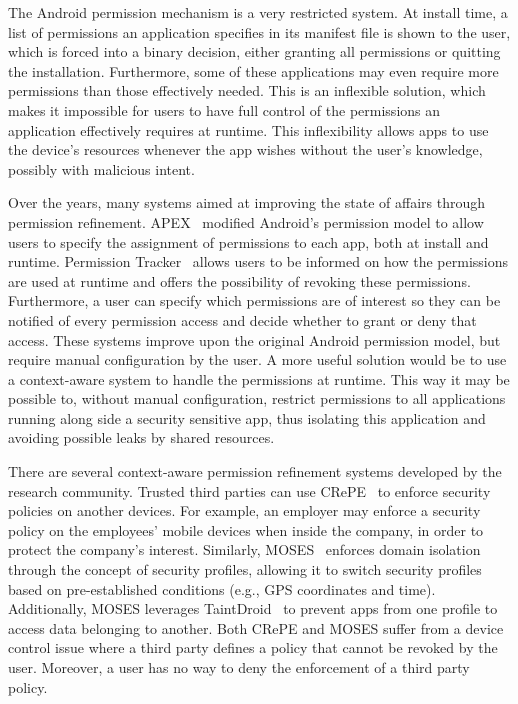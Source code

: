 The Android permission mechanism is a very restricted system. At install time, a list of permissions an application specifies in its manifest file is shown to the user, which is forced into a binary decision, either granting all permissions or quitting the installation. Furthermore, some of these applications may even require more permissions than those effectively needed. This is an inflexible solution, which makes it impossible for users to have full control of the permissions an application effectively requires at runtime. This inflexibility allows apps to use the device's resources whenever the app wishes without the user's knowledge, possibly with malicious intent.

Over the years, many systems aimed at improving the state of affairs through permission refinement. APEX~\cite{nauman2010apex} modified Android's permission model to allow users to specify the assignment of permissions to each app, both at install and runtime. Permission Tracker~\cite{kern2012permission} allows users to be informed on how the permissions are used at runtime and offers the possibility of revoking these permissions. Furthermore, a user can specify which permissions are of interest so they can be notified of every permission access and decide whether to grant or deny that access. These systems improve upon the original Android permission model, but require manual configuration by the user. %
A more useful solution would be to use a context-aware system to handle the permissions at runtime. This way it may be possible to, without manual configuration, restrict permissions to all applications running along side a security sensitive app, thus isolating this application and avoiding possible leaks by shared resources.

There are several context-aware permission refinement systems developed by the research community. Trusted third parties can use CRePE~\cite{conti2011crepe} to enforce security policies on another devices. For example, an employer may enforce a security policy on the employees' mobile devices when inside the company, in order to protect the company's interest.
Similarly, MOSES~\cite{russello2012moses} enforces domain isolation through the concept of security profiles, allowing it to switch security profiles based on pre-established conditions (e.g., GPS coordinates and time).
Additionally, MOSES leverages TaintDroid~\cite{enck2014taintdroid} to prevent apps from one profile to access data belonging to another. Both CRePE and MOSES suffer from a device control issue where a third party defines a policy that cannot be revoked by the user. Moreover, a user has no way to deny the enforcement of a third party policy. 

